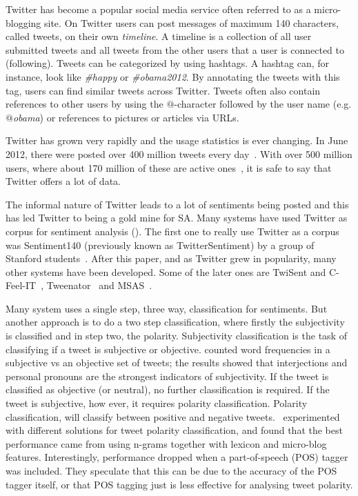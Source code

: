 Twitter has become a popular social media service often referred to as a micro-blogging site. On Twitter users can post messages of maximum 140 characters, called tweets, on their own \emph{timeline}. A timeline is a collection of all user submitted tweets and all tweets from the other users that a user is connected to (following). Tweets can be categorized by using hashtags. A hashtag can, for instance, look like \emph{\#happy} or \emph{\#obama2012}. By annotating the tweets with this tag, users can find similar tweets across Twitter. Tweets often also contain references to other users by using the $@$-character followed by the user name (e.g. \emph{$@$obama}) or references to pictures or articles via URLs.

Twitter has grown very rapidly and the usage statistics is ever changing. In June 2012, there were posted over 400 million tweets every day~\citep{site:twitterusage}. With over 500 million users, where about 170 million of these are active ones~\citep{site:users}, it is safe to say that Twitter offers a lot of data.

The informal nature of Twitter leads to a lot of sentiments being posted and this has led Twitter to being a gold mine for SA. Many systems have used Twitter as corpus for sentiment analysis (). The first one to really use Twitter as a corpus was Sentiment140 (previously known as TwitterSentiment) by a group of Stanford students~\citep{article:go}. After this paper, and as Twitter grew in popularity, many other systems have been developed. Some of the later ones are TwiSent and C-Feel-IT~\citep{mukherjee2012twisent}, Tweenator~\citep{saif2012semantic} and MSAS~\citep{chamlertwat2012discovering}.

Many system uses a single step, three way, classification for sentiments. But another approach is to do a two step classification, where firstly the subjectivity is classified and in step two, the polarity. Subjectivity classification is the task of classifying if a tweet is subjective or objective. \cite{article:pak} counted word frequencies in a subjective vs an objective set of tweets; the results showed that interjections and personal pronouns are the strongest indicators of subjectivity. If the tweet is classified as objective (or neutral), no further classification is required. If the tweet is subjective, how ever, it requires polarity classification. Polarity classification, will classify between positive and negative tweets.~\cite{article:omg} experimented with different solutions for tweet polarity classification, and found that the best performance came from using n-grams together with lexicon and micro-blog features. Interestingly, performance dropped when a part-of-speech (POS) tagger was included. They speculate that this can be due to the accuracy of the POS tagger itself, or that POS tagging just is less effective for analysing tweet polarity.

